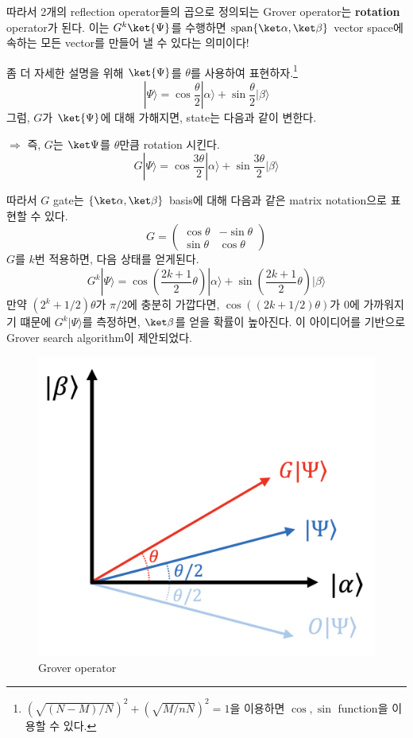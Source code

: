 따라서 2개의 reflection operator들의 곱으로 정의되는 Grover operator는 \textbf{rotation} operator가 된다.
이는 $G^k\ket{\Psi}$를 수행하면 $\text{span}\{\ket \alpha, \ket \beta \}$ vector space에 속하는 모든 vector를 만들어 낼 수 있다는 의미이다!

\vspace{1em}

좀 더 자세한 설명을 위해 $\ket{\Psi}$를 $\theta$를 사용하여 표현하자.\footnote{$(\sqrt{(N-M)/N})^2 + (\sqrt{M/nN})^2 = 1$을 이용하면 $\cos, \sin$ function을 이용할 수 있다.}
\begin{equation*}
  |\Psi\rangle=\cos \frac{\theta}{2}|\alpha\rangle+\sin \frac{\theta}{2}|\beta\rangle
\end{equation*}
그럼, $G$가 $\ket{\Psi}$에 대해 가해지면, state는 다음과 같이 변한다.

$\Rightarrow$ 즉, $G$는 $\ket \Psi$를 $\theta$만큼 rotation 시킨다.
\begin{equation}
  G|\Psi\rangle=\cos \frac{3 \theta}{2}|\alpha\rangle+\sin \frac{3 \theta}{2}|\beta\rangle
\end{equation}

따라서 $G$ gate는 $\{\ket \alpha, \ket \beta\}$ basis에 대해 다음과 같은 matrix notation으로 표현할 수 있다.
\begin{equation*}
  G=\left(\begin{array}{cc}
    \cos \theta & -\sin \theta \\
    \sin \theta & \cos \theta
    \end{array}\right)
\end{equation*}
$G$를 $k$번 적용하면, 다음 상태를 얻게된다.
\begin{equation*}
  G^k|\Psi\rangle=\cos \left(\frac{2 k+1}{2} \theta\right)|\alpha\rangle+\sin \left(\frac{2 k+1}{2} \theta\right)|\beta\rangle
\end{equation*}
만약 $(2^k+1 / 2)\theta$가 $\pi/2$에 충분히 가깝다면, $\cos((2k+1/2) \theta)$가 0에 가까워지기 떄문에 $G^k|\Psi\rangle$를 측정하면, $\ket \beta$를 얻을 확률이 높아진다.
이 아이디어를 기반으로 Grover search algorithm이 제안되었다.

\begin{figure}
  \centering
  \includegraphics[width=0.35\linewidth]{figures/grover.png}
  \caption{Grover operator}
  \label{fig:grover-operator}
\end{figure}


